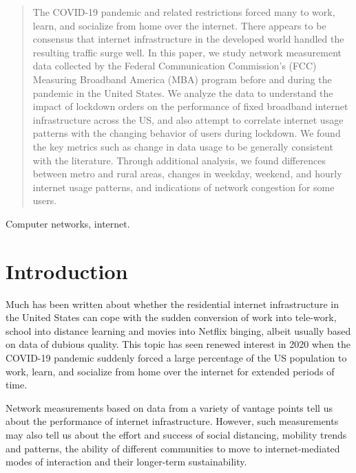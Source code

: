 \documentclass[conference,10pt]{IEEEtran}
\begin{document}
\begin{abstract}
The COVID-19 pandemic and related restrictions forced many to work, learn, and socialize from home over the internet. There appears to be consensus that internet infrastructure in the developed world handled the resulting traffic surge well. In this paper, we study network measurement data collected by the Federal Communication Commission's (FCC) Measuring Broadband America (MBA) program before and during the pandemic in the United States. We analyze the data to understand the impact of lockdown orders on the performance of fixed broadband internet infrastructure across the US, and also attempt to correlate internet usage patterns with the changing behavior of users during lockdown. We found the key metrics such as change in data usage to be generally consistent with the literature. Through additional analysis, we found differences between metro and rural areas, changes in weekday, weekend, and hourly internet usage patterns, and indications of network congestion for some users.


\end{abstract}

\begin{IEEEkeywords}
Computer networks, internet.
\end{IEEEkeywords}

\section{Introduction}
\label{sec:introduction}

Much has been written about whether the residential internet infrastructure in the United States can cope with the sudden conversion of work into tele-work, school into distance learning and movies into Netflix binging, albeit usually based on data of dubious quality. This topic has seen renewed interest in 2020 when the COVID-19 pandemic suddenly forced a large percentage of the US population to work, learn, and socialize from home over the internet for extended periods of time.

Network measurements based on data from a variety of vantage points tell us about the performance of internet infrastructure. However, such measurements may also tell us about the effort and success of social distancing, mobility trends and patterns, the ability of different communities to move to internet-mediated modes of interaction and their longer-term sustainability.
\end{document}
